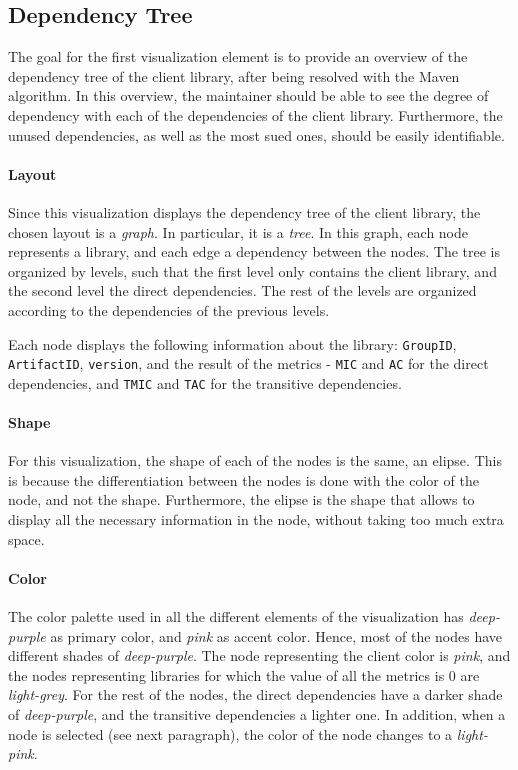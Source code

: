 \subsection{Dependency Tree}\label{sec:visualization-dependency-tree}
The goal for the first visualization element is to provide an overview of the dependency tree of the client library, after being resolved with the Maven algorithm. In this overview, the maintainer should be able to see the degree of dependency with each of the dependencies of the client library. Furthermore, the unused dependencies, as well as the most sued ones, should be easily identifiable.

\paragraph{Layout}
Since this visualization displays the dependency tree of the client library, the chosen layout is a \textit{graph}. In particular, it is a \textit{tree}. In this graph, each node represents a library, and each edge a dependency between the nodes. The tree is organized by levels, such that the first level only contains the client library, and the second level the direct dependencies. The rest of the levels are organized according to the dependencies of the previous levels.

Each node displays the following information about the library: \texttt{GroupID}, \texttt{ArtifactID}, \texttt{version}, and the result of the metrics - \texttt{MIC} and \texttt{AC} for the direct dependencies, and \texttt{TMIC} and \texttt{TAC} for the transitive dependencies.

\paragraph{Shape}
For this visualization, the shape of each of the nodes is the same, an elipse. This is because the differentiation between the nodes is done with the color of the node, and not the shape. Furthermore, the elipse is the shape that allows to display all the necessary information in the node, without taking too much extra space.

\paragraph{Color}
The color palette used in all the different elements of the visualization has \textit{deep-purple} as primary color, and \textit{pink} as accent color. Hence, most of the nodes have different shades of \textit{deep-purple}. The node representing the client color is \textit{pink}, and the nodes representing libraries for which the value of all the metrics is 0 are \textit{light-grey}. For the rest of the nodes, the direct dependencies have a darker shade of \textit{deep-purple}, and the transitive dependencies a lighter one. 
In addition, when a node is selected (see next paragraph), the color of the node changes to a \textit{light-pink}.


